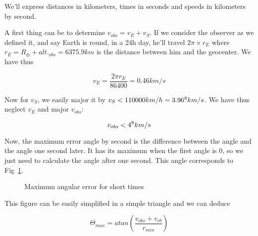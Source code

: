 We'll express distances in kilometers, times in seconds and speeds in kilometers by second.

A first thing can be to determine $v_{obs}=v_E+v_S$. If we consider the observer as we defined it, and say Earth is round, in a 24h day, he'll travel $2\pi\times r_{E}$ where $r_{E}=R_\oplus+alt._{obs}=6375.9km$ is the distance between him and the geocenter. We have thus 

\begin{equation}
v_E = \frac{2\pi r_E}{86400} = 0.46km/s
\end{equation}

Now for $v_S$, we easily major it by $v_S<110000km/h=3.96\time 10^8km/s$. We have thus neglect $v_E$ and major $v_{obs}$:

\begin{equation}
v_{obs} < 4\time 10^8km/s
\end{equation}

Now, the maximum error angle by second is the difference between the angle and the angle one second later. It has its maximum when the first angle is 0, so we just need to calculate the angle after one second. This angle corresponds to Fig~\ref{maxangularerror}.

\begin{figure}
\centering 
{}
\caption{Maximum angular error for short times}\label{maxangularerror}
\end{figure}

This figure can be easily simplified in a simple triangle and we can deduce 

\begin{equation}
\Theta_{max}=atan(\frac{v_{obs}+v_{cb}}{r_{min}})
\end{equation}











